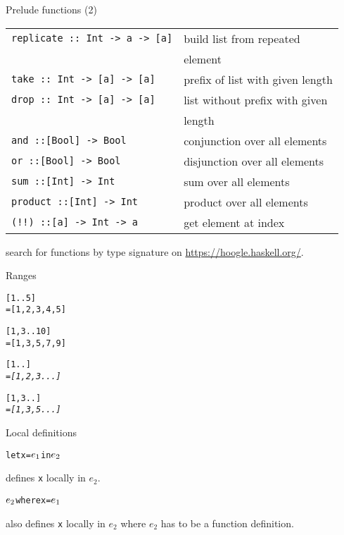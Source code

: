 \documentclass{beamer}
\def\code#1{\texttt{\frenchspacing#1}}
\begin{document}
\begin{frame}{Prelude functions (2)}

\begin{tabular}{ll}
    \code{replicate :: Int -> a -> [a]} & build list from repeated \\
    & element\pause \\
    \code{take :: Int -> [a] -> [a]} & prefix of list with given length\pause \\
    \code{drop :: Int -> [a] -> [a]} & list without prefix with given \\
    & length\pause \\
    \code{and ::[Bool] -> Bool} & conjunction over all elements\pause \\
    \code{or ::[Bool] -> Bool} & disjunction over all elements\pause \\
    \code{sum ::[Int] -> Int} & sum over all elements\pause \\
    \code{product ::[Int] -> Int} & product over all elements\pause \\
    \code{(!!) ::[a] -> Int -> a} & get element at index \\
\end{tabular}

\pause

\vspace{1cm}
search for functions by type signature on \url{https://hoogle.haskell.org/}.

\end{frame}

\begin{frame}[fragile]{Ranges}

\begin{alltt}
[1..5]\pause
= [1,2,3,4,5]

[1,3..10]\pause
= [1,3,5,7,9]

[1..]\pause
= \textit{[1,2,3...]}

[1,3..]\pause
= \textit{[1,3,5...]}
\end{alltt}

\end{frame}

\begin{frame}[fragile]{Local definitions}

\begin{alltt}
let x = \(e\sb1\) in \(e\sb2\)
\end{alltt}
defines \code{x} locally in $e_2$.

\pause

\vspace{1cm}
\begin{alltt}
\(e\sb2\) where x = \(e\sb1\)
\end{alltt}
also defines \code{x} locally in $e_2$ where $e_2$ has to be a function definition.

\end{frame}
\end{document}
